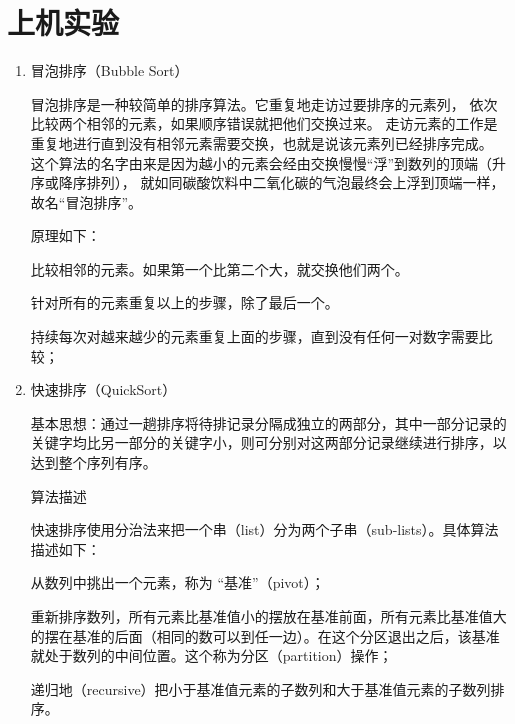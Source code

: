 \section{上机实验}
\begin{enumerate}
\item 冒泡排序（Bubble Sort）

冒泡排序是一种较简单的排序算法。它重复地走访过要排序的元素列，
依次比较两个相邻的元素，如果顺序错误就把他们交换过来。
走访元素的工作是重复地进行直到没有相邻元素需要交换，也就是说该元素列已经排序完成。
这个算法的名字由来是因为越小的元素会经由交换慢慢“浮”到数列的顶端（升序或降序排列），
就如同碳酸饮料中二氧化碳的气泡最终会上浮到顶端一样，故名“冒泡排序”。

原理如下：

比较相邻的元素。如果第一个比第二个大，就交换他们两个。

针对所有的元素重复以上的步骤，除了最后一个。

持续每次对越来越少的元素重复上面的步骤，直到没有任何一对数字需要比较；

\item 快速排序（QuickSort）

基本思想：通过一趟排序将待排记录分隔成独立的两部分，其中一部分记录的关键字均比另一部分的关键字小，则可分别对这两部分记录继续进行排序，以达到整个序列有序。

算法描述

    快速排序使用分治法来把一个串（list）分为两个子串（sub-lists）。具体算法描述如下：

    从数列中挑出一个元素，称为 “基准”（pivot）；

    重新排序数列，所有元素比基准值小的摆放在基准前面，所有元素比基准值大的摆在基准的后面（相同的数可以到任一边）。在这个分区退出之后，该基准就处于数列的中间位置。这个称为分区（partition）操作；

    递归地（recursive）把小于基准值元素的子数列和大于基准值元素的子数列排序。

\end{enumerate}

